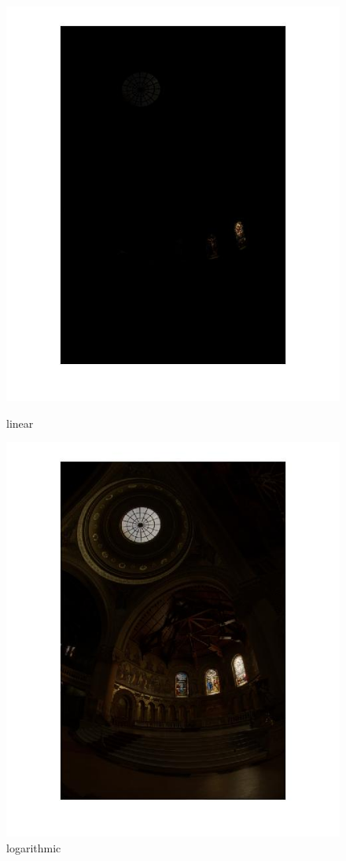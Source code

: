 {  
  \begin{figure}[!htb]
  	\includegraphics[width=\linewidth]{images/linearhdr1}
  	\caption{linear}\label{fig:logtonemap}
  	\endminipage\hfill
  	\includegraphics[width=\linewidth]{images/loghdr1}
  	\caption{logarithmic}\label{fig:lineartonemap}
  	\endminipage\hfill
   \end{figure}
      
}
